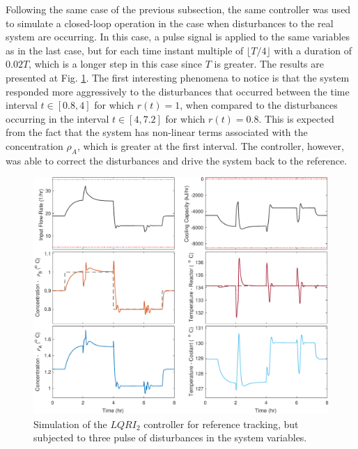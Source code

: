 \documentclass[a4paper,11pt]{book}
\numberwithin{figure}{chapter}
\numberwithin{equation}{chapter}
\numberwithin{table}{chapter}
\theoremstyle{definition}
\begin{document}
Following the same case of the previous subsection, the same controller was used to simulate a closed-loop operation in the case when disturbances to the real system are occurring. In this case, a pulse signal is applied to the same variables as in the last case, but for each time instant multiple of $\lfloor T/4 \rfloor$ with a duration of $0.02T$, which is a longer step in this case since $T$ is greater. The results are presented at Fig. \ref{fig:lqri02}. The first interesting phenomena to notice is that the system responded more aggressively to the disturbances that occurred between the time interval $t \in [0.8, 4]$ for which $r(t) = 1$, when compared to the disturbances occurring in the interval $t \in [4, 7.2]$ for which $r(t) = 0.8$. This is expected from the fact that the system has non-linear terms associated with the concentration $\rho_A$, which is greater at the first interval. The controller, however, was able to correct the disturbances and drive the system back to the reference.

\begin{figure}[ht] \centering
	\includegraphics[width=\textwidth]{chapter7/lqri02}
	
	\caption{Simulation of the $LQRI_2$ controller for reference tracking, but subjected to three pulse of disturbances in the system variables.}
	\label{fig:lqri02}
\end{figure}	
\end{document}
